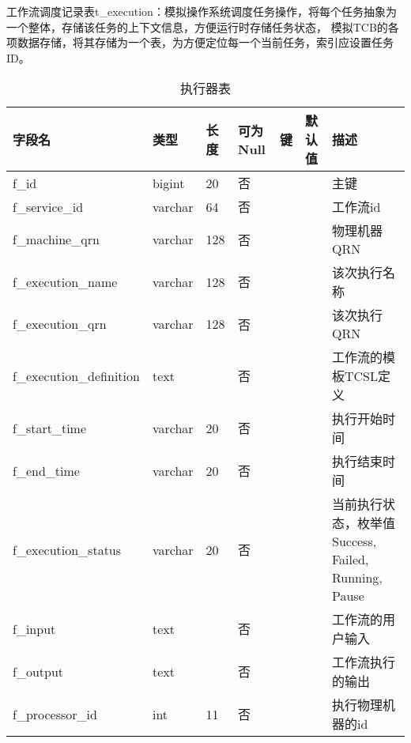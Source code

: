 工作流调度记录表t\_execution：模拟操作系统调度任务操作，将每个任务抽象为一个整体，存储该任务的上下文信息，方便运行时存储任务状态，
模拟TCB的各项数据存储，将其存储为一个表，为方便定位每一个当前任务，索引应设置任务ID。
\begin{table}[H]
    \centering
    \caption{执行器表}
    \label{tab:t_execution}
    \begin{tabular}{lllllll}
        \toprule
        字段名	&类型	&长度	&可为Null	&键	&默认值	&描述 \\
        \midrule
        f\_id	&bigint	&20 &否 & & &主键 \\
        f\_service\_id	&varchar	&64 &否 & & &工作流id \\
        f\_machine\_qrn	&varchar	&128 &否 & & &物理机器QRN \\
        f\_execution\_name	&varchar	&128 &否 & & &该次执行名称 \\
        f\_execution\_qrn	&varchar	&128 &否 & & &该次执行QRN \\
        f\_execution\_definition	&text	& &否 & & &工作流的模板TCSL定义 \\
        f\_start\_time	&varchar	&20 &否 & & &执行开始时间 \\
        f\_end\_time	&varchar	&20 &否 & & &执行结束时间 \\
        f\_execution\_status	&varchar	&20 &否 & & &当前执行状态，枚举值Success, Failed, Running, Pause \\
        f\_input	&text	& &否 & & &工作流的用户输入 \\
        f\_output	&text	& &否 & & &工作流执行的输出 \\
        f\_processor\_id	&int	&11 &否 & & &执行物理机器的id \\
        \bottomrule
    \end{tabular}
\end{table}


